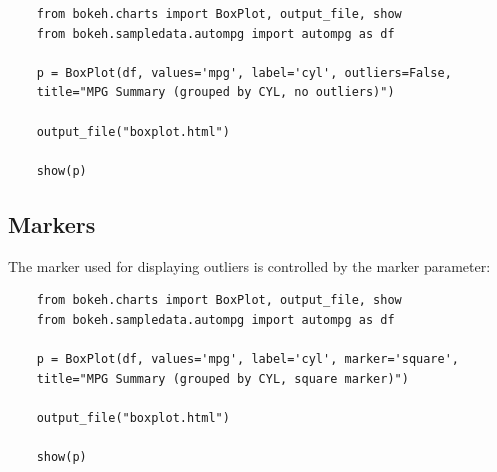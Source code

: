 \documentclass[a4paper,12pt]{article}
\begin{document}
{
	\large
	\begin{verbatim}
	from bokeh.charts import BoxPlot, output_file, show
	from bokeh.sampledata.autompg import autompg as df
	
	p = BoxPlot(df, values='mpg', label='cyl', outliers=False,
	title="MPG Summary (grouped by CYL, no outliers)")
	
	output_file("boxplot.html")
	
	show(p)
	\end{verbatim}
}

\subsection*{Markers}
The marker used for displaying outliers is controlled by the marker parameter:
{
	\large
	\begin{verbatim}
	from bokeh.charts import BoxPlot, output_file, show
	from bokeh.sampledata.autompg import autompg as df
	
	p = BoxPlot(df, values='mpg', label='cyl', marker='square',
	title="MPG Summary (grouped by CYL, square marker)")
	
	output_file("boxplot.html")
	
	show(p)
	\end{verbatim}
}
\newpage
\end{document}
